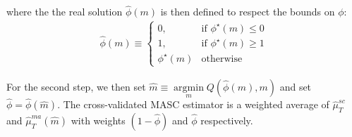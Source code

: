 \documentclass[letterpaper, 12pt]{article}
\theoremstyle{definition}
\begin{document}
where the the real solution $\hat{\phi}(m)$ is then defined to respect the bounds on $\phi$:
\begin{align*}
\hat{\phi}(m)
\equiv
\begin{cases}
0, &\text{if } \phi^{\star}(m) \leq 0 \\
1, &\text{if } \phi^{\star}(m) \geq 1 \\
\phi^{\star}(m) &\text{otherwise}
\end{cases}
\end{align*}

For the second step, we then set $\hat{m} \equiv \underset{m}{\operatorname{argmin}} Q(\hat{\phi}(m),m)$ and set $\hat{\phi}=\hat{\phi}(\hat{m})$.
The cross-validated MASC estimator is a weighted average of $\hat{\mu}^{sc}_T$ and $\hat{\mu}^{ma}_T(\hat{m})$ with weights $(1-\hat{\phi})$
and $\hat{\phi}$ respectively.
\end{document}
